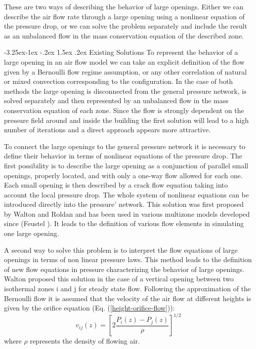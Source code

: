 \documentclass[12pt]{report}
\makeatletter
\newcommand\subsubparagraph{\@startsection{paragraph}{5}{\z@}%
                                      {-3.25ex\@plus -1ex \@minus -.2ex}%
                                      {1.5ex \@plus .2ex}
                                      {\normalfont\normalsize\bfseries}}
\makeatother
\begin{document}
These are two ways of describing the behavior of large openings. Either we can
describe the air flow rate through a large opening using a nonlinear equation of
the pressure drop, or we can solve the problem separately and include the result as
an unbalanced flow in the mass conservation equation of the described zone. 

\subsubparagraph{Existing Solutions}
To represent the behavior of a large opening in an air flow model we can take an
explicit definition of the flow given by a Bernoulli flow regime assumption, or
any other correlation of natural or mixed convection \cite{barakat_1987} corresponding to the
configuration. In the case of both methods the large opening is disconnected from
the general pressure network, is solved separately and then represented by an
unbalanced flow in the mass conservation equation of each zone. Since the flow
is strongly dependent on the pressure field around and inside the building the first
solution will lead to a high number of iterations and a direct approach appears
more attractive.

To connect the large openings to the general pressure network it is necessary to
define their behavior in terms of nonlinear equations of the pressure drop. The
first possibility is to describe the large opening as a conjunction of parallel small
openings, properly located, and with only a one-way flow allowed for each one.
Each small opening is then described by a crack flow equation taking into
account the local pressure drop. The whole system of nonlinear equations can be
introduced directly into the pressure’ network. This solution was first proposed by
Walton \cite{walton_1984} and Roldan \cite{roldan_1985} and has been used in various multizone models
developed since (Feustel \cite{feustel_1989}). It leads to the definition of various flow elements
in simulating one large opening.

A second way to solve this problem is to interpret the flow equations of large
openings in terms of non linear pressure laws. This method leads to the definition
of new flow equations in pressure characterizing the behavior of large openings.
Walton \cite{walton_1989} proposed this solution in the case of a vertical opening between two
isothermal zones i and j for steady state flow. Following the approximation of the
Bernoulli flow it is assumed that the velocity of the air flow at different heights is
given by the orifice equation (Eq. (\ref{height-orifice-flow})):
\begin{equation}\label{height-orifice-flow}
v_{ij}(z) = \left[2\frac{P_i(z)-P_j(z)}{\rho}\right]^{1/2}
\end{equation}
where $\rho$ represents the density of flowing air.
\end{document}
